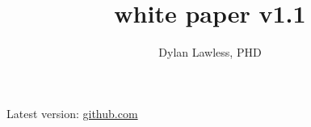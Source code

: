 \documentclass{article}
\newcommand{\whitepaperversion}{white paper v1.1}
\begin{document}
%


\title{\Large \bf \pmu\\
{\whitepaperversion}}
\author[1]{\rm Dylan Lawless, PHD}

\maketitle
\color{kispiblack}
Latest version: \href{https://github.com/DylanLawless/precision_med_group/tree/main/whitepaper_1}{github.com}
\tableofcontents
{} 
\clearpage


\clearpage














\clearpage

\clearpage






\end{document}
